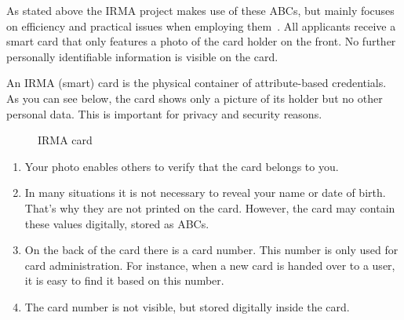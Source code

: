 As stated above the IRMA project makes use of these ABCs, but mainly focuses on efficiency and practical issues when employing them~\cite{abcofabc}. All applicants receive a smart card that only features a photo of the card holder on the front. No further personally identifiable information is visible on the card.

An IRMA (smart) card is the physical container of attribute-based credentials. As you can see below, the card shows only a picture of its holder but no other personal data. This is important for privacy and security reasons.

\begin{figure}[!ht]
  \centering
  \caption{IRMA card}
  \label{fig:dummy}
\end{figure}

\begin{enumerate}
	\item Your photo enables others to verify that the card belongs to you.
  \item In many situations it is not necessary to reveal your name or date of birth. That’s why they are not printed on the card. However, the card may contain these values digitally, stored as ABCs.
  \item On the back of the card there is a card number. This number is only used for card administration. For instance, when a new card is handed over to a user, it is easy to find it based on this number.
  \item The card number is not visible, but stored digitally inside the card.
\end{enumerate}

